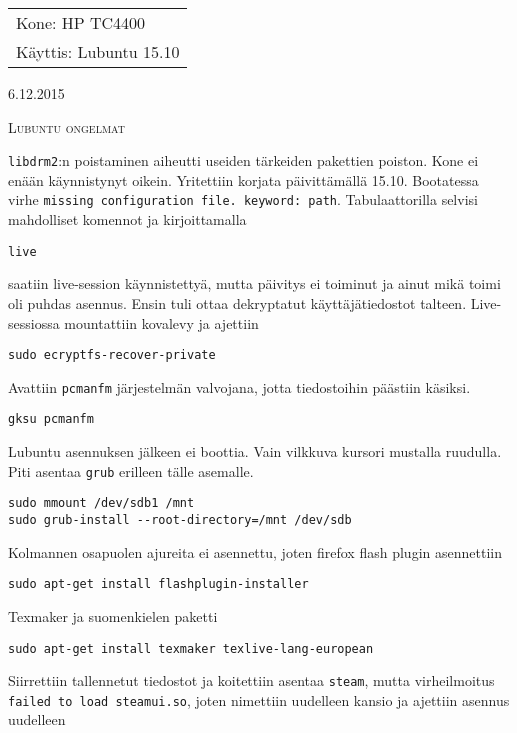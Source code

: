 \documentclass[main.tex]{subfiles}
\begin{document}
\thispagestyle{empty}
\begin{tabular}[t]{l}
Kone: HP TC4400\\
Käyttis: Lubuntu 15.10
\end{tabular}
\hfill 6.12.2015

{\scshape\Large{Lubuntu ongelmat}}

\texttt{libdrm2}:n poistaminen aiheutti useiden tärkeiden pakettien poiston. Kone ei enään käynnistynyt oikein. Yritettiin korjata päivittämällä 15.10. Bootatessa virhe \texttt{missing configuration file. keyword: path}. Tabulaattorilla selvisi mahdolliset komennot ja kirjoittamalla 

\begin{lstlisting}
live
\end{lstlisting}

saatiin live-session käynnistettyä, mutta päivitys ei toiminut ja ainut mikä toimi oli puhdas asennus. Ensin tuli ottaa dekryptatut käyttäjätiedostot talteen. Live-sessiossa mountattiin kovalevy ja ajettiin

\begin{lstlisting}
sudo ecryptfs-recover-private
\end{lstlisting}

Avattiin \texttt{pcmanfm} järjestelmän valvojana, jotta tiedostoihin päästiin käsiksi.

\begin{lstlisting}
gksu pcmanfm
\end{lstlisting}

Lubuntu asennuksen jälkeen ei boottia. Vain vilkkuva kursori mustalla ruudulla. Piti asentaa \texttt{grub} erilleen tälle asemalle.

\begin{lstlisting}
sudo mmount /dev/sdb1 /mnt
sudo grub-install --root-directory=/mnt /dev/sdb
\end{lstlisting}

Kolmannen osapuolen ajureita ei asennettu, joten firefox flash plugin asennettiin

\begin{lstlisting}
sudo apt-get install flashplugin-installer 
\end{lstlisting}

Texmaker ja suomenkielen paketti

\begin{lstlisting}
sudo apt-get install texmaker texlive-lang-european
\end{lstlisting}

Siirrettiin tallennetut tiedostot ja koitettiin asentaa \texttt{steam}, mutta virheilmoitus \texttt{failed to load steamui.so}, joten nimettiin uudelleen kansio ja ajettiin asennus uudelleen
\end{document}
